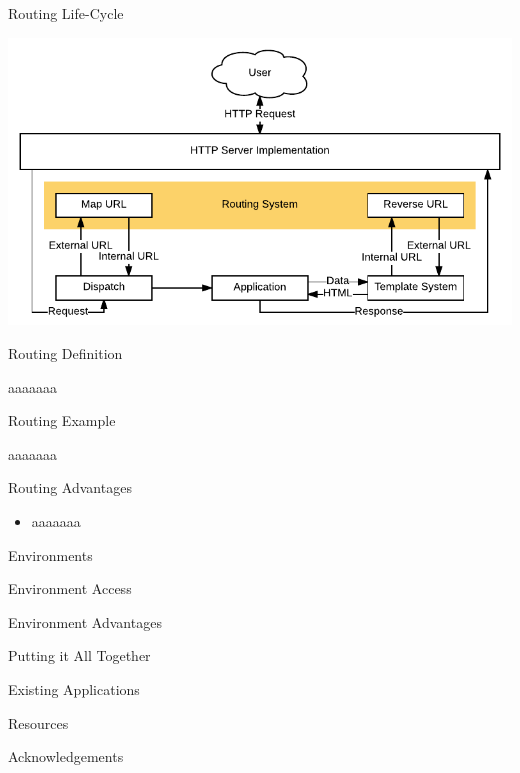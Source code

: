 \documentclass[14pt]{beamer}
\newcommand{\toptitle}[1]{
  {\huge #1} \\
  \vspace{0.2cm}
}
\begin{document}
\begin{frame}
  \toptitle{Routing Life-Cycle}
  \includegraphics[width=\columnwidth]{request}
\end{frame}

\begin{frame}[fragile]
  \toptitle{Routing Definition}
\begin{lispcode}
aaaaaaa
\end{lispcode}
\end{frame}

\begin{frame}[fragile]
  \toptitle{Routing Example}
\begin{lispcode}
aaaaaaa
\end{lispcode}
\end{frame}

\begin{frame}
  \toptitle{Routing Advantages}
  \begin{itemize}
  \item aaaaaaa
  \end{itemize}
\end{frame}

\begin{frame}
  \toptitle{Environments}
\end{frame}

\begin{frame}
  \toptitle{Environment Access}
\end{frame}

\begin{frame}
  \toptitle{Environment Advantages}
\end{frame}

\begin{frame}
  \toptitle{Putting it All Together}
\end{frame}

\begin{frame}
  \toptitle{Existing Applications}
\end{frame}

\begin{frame}
  \toptitle{Resources}
\end{frame}

\begin{frame}
  \toptitle{Acknowledgements}
\end{frame}
\end{document}
